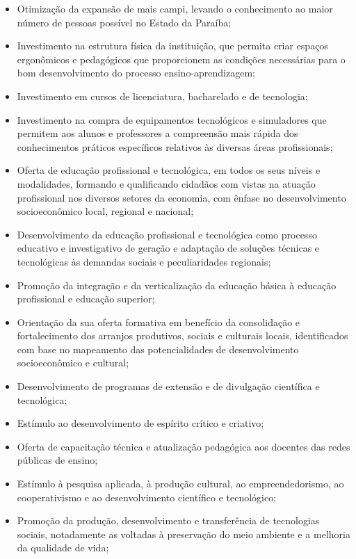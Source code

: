 \begin{itemize}
  \item Otimização da expansão de mais campi, levando o conhecimento ao  maior número de pessoas possível no Estado da Paraíba;
  \item Investimento na estrutura física da instituição, que permita criar espaços ergonômicos e pedagógicos que proporcionem as condições necessárias para o bom desenvolvimento do processo ensino-aprendizagem;
  \item Investimento em cursos de licenciatura, bacharelado e de tecnologia;
  \item Investimento na compra de equipamentos tecnológicos e simuladores que permitem aos alunos e professores a compreensão mais rápida dos conhecimentos práticos específicos relativos às diversas áreas profissionais;
  \item Oferta de educação profissional e tecnológica, em todos os seus níveis e modalidades, formando e qualificando cidadãos com vistas na atuação profissional nos diversos setores da economia, com ênfase no desenvolvimento socioeconômico local, regional e nacional;
  \item Desenvolvimento da educação profissional e tecnológica como processo educativo e investigativo de geração e adaptação de soluções técnicas e tecnológicas às demandas sociais e peculiaridades regionais;
  \item Promoção da integração e da verticalização da educação básica à educação profissional e educação superior;
  \item Orientação da sua oferta formativa em benefício da consolidação e fortalecimento dos arranjos produtivos, sociais e culturais locais, identificados com base no mapeamento das potencialidades de desenvolvimento socioeconômico e cultural;
  \item Desenvolvimento de programas de extensão e de divulgação científica e tecnológica;
  \item Estímulo ao desenvolvimento de espírito crítico e criativo;
  \item Oferta de capacitação técnica e atualização pedagógica aos docentes das redes públicas de ensino;
  \item Estímulo à pesquisa aplicada, à produção cultural, ao empreendedorismo, ao cooperativismo e ao desenvolvimento científico e tecnológico;
  \item Promoção da produção, desenvolvimento e transferência de tecnologias sociais, notadamente as voltadas à preservação do meio ambiente e a melhoria da qualidade de vida;

\end{itemize}
